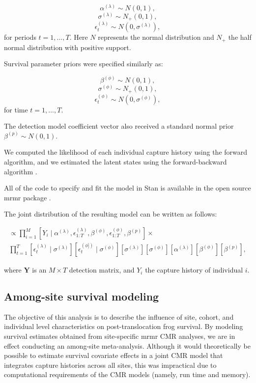 \documentclass[9pt,twoside,lineno]{pnas-new-SI}
\begin{document}
\[\alpha^{(\lambda)} \sim N(0,1),\]
\[\sigma^{(\lambda)} \sim N_+(0,1),\]
\[\epsilon^{(\lambda)}_t \sim N(0, \sigma^{(\lambda)}),\] for periods
\(t=1, ..., T\). Here \(N\) represents the normal distribution and
\(N_+\) the half normal distribution with positive support.

Survival parameter priors were specified similarly as:

\[\beta^{(\phi)} \sim N(0, 1),\] \[\sigma^{(\phi)} \sim N_+(0, 1),\]
\[\epsilon^{(\phi)}_t \sim N(0, \sigma^{(\phi)}),\] for time
\(t=1, ..., T\).

The detection model coefficient vector also received a standard normal
prior \(\beta^{(p)} \sim N(0, 1)\).

We computed the likelihood of each individual capture history using the
forward algorithm, and we estimated the latent states using the
forward-backward algorithm \citep{zucchini2009, joseph2018}.

All of the code to specify and fit the model in Stan is available in the
open source mrmr package \citep{joseph2019}.

The joint distribution of the resulting model can be written as follows:

\begin{multline*}
[\alpha^{(\lambda)}, \sigma^{(\lambda)}, \epsilon^{(\lambda)}_{1:T}, \beta^{(\phi)}, \sigma^{(\phi)}, \epsilon^{(\phi)}_{1:T}, \beta^{(p)} \mid \pmb Y] \propto \prod_{i=1}^M [Y_i \mid \alpha^{(\lambda)}, \epsilon^{(\lambda)}_{1:T}, \beta^{(\phi)}, \epsilon^{(\phi)}_{1:T}, \beta^{(p)}] \times \\
\prod_{t=1}^T [\epsilon_t^{(\lambda)} \mid \sigma^{(\lambda)}] [\epsilon_t^{(\phi])} \mid \sigma^{(\phi)}] [\sigma^{(\lambda)}] [\sigma^{(\phi)}] [\alpha^{(\lambda)}] [\beta^{(\phi)}] [\beta^{(p)}],
\end{multline*}

where \(\pmb Y\) is an \(M \times T\) detection matrix, and \(Y_i\) the
capture history of individual \(i\).

\hypertarget{among-site-survival-modeling}{%
\subsection{Among-site survival
modeling}\label{among-site-survival-modeling}}

The objective of this analysis is to describe the influence of site,
cohort, and individual level characteristics on post-translocation frog
survival. By modeling survival estimates obtained from site-specific
mrmr CMR analyses, we are in effect conducting an among-site
meta-analysis. Although it would theoretically be possible to estimate
survival covariate effects in a joint CMR model that integrates capture
histories across all sites, this was impractical due to computational
requirements of the CMR models (namely, run time and memory).
\end{document}
